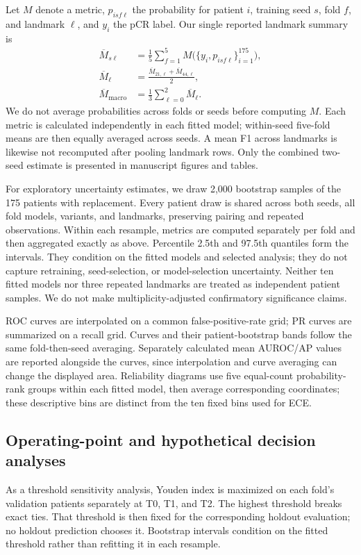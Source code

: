 Let $M$ denote a metric, $p_{isf\ell}$ the probability for patient $i$, training seed $s$, fold $f$, and landmark $\ell$, and $y_i$ the pCR label. Our single reported landmark summary is
\begin{equation}
\begin{aligned}
 \overline M_{s\ell}&=\frac{1}{5}\sum_{f=1}^{5}M\bigl(\{y_i,p_{isf\ell}\}_{i=1}^{175}\bigr),\\
 \overline M_{\ell}&=\frac{\overline M_{21,\ell}+\overline M_{44,\ell}}{2},\\
 \overline M_{\mathrm{macro}}&=\frac{1}{3}\sum_{\ell=0}^{2}\overline M_{\ell}.
\end{aligned}
\end{equation}
We do not average probabilities across folds or seeds before computing $M$. Each metric is calculated independently in each fitted model; within-seed five-fold means are then equally averaged across seeds. A mean F1 across landmarks is likewise not recomputed after pooling landmark rows. Only the combined two-seed estimate is presented in manuscript figures and tables.

For exploratory uncertainty estimates, we draw 2,000 bootstrap samples of the 175 patients with replacement. Every patient draw is shared across both seeds, all fold models, variants, and landmarks, preserving pairing and repeated observations. Within each resample, metrics are computed separately per fold and then aggregated exactly as above. Percentile 2.5th and 97.5th quantiles form the intervals. They condition on the fitted models and selected analysis; they do not capture retraining, seed-selection, or model-selection uncertainty. Neither ten fitted models nor three repeated landmarks are treated as independent patient samples. We do not make multiplicity-adjusted confirmatory significance claims.

ROC curves are interpolated on a common false-positive-rate grid; PR curves are summarized on a recall grid. Curves and their patient-bootstrap bands follow the same fold-then-seed averaging. Separately calculated mean AUROC/AP values are reported alongside the curves, since interpolation and curve averaging can change the displayed area. Reliability diagrams use five equal-count probability-rank groups within each fitted model, then average corresponding coordinates; these descriptive bins are distinct from the ten fixed bins used for ECE.

\subsection{Operating-point and hypothetical decision analyses}
As a threshold sensitivity analysis, Youden index is maximized on each fold's validation patients separately at T0, T1, and T2. The highest threshold breaks exact ties. That threshold is then fixed for the corresponding holdout evaluation; no holdout prediction chooses it. Bootstrap intervals condition on the fitted threshold rather than refitting it in each resample.

